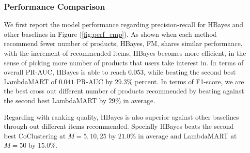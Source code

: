 \begin{table}[htb]
\begin{center}
\end{center}
\caption{NDCG on e-commerce recommendations}
\label{NDCG_cmp}
\end{table}

\subsubsection{Performance Comparison}
We first report the model performance regarding precision-recall for HBayes and other baselines in Figure (\ref{fig:perf_cmp}).  As shown when each method recommend fewer number of products, HBayes, FM, shares similar performance, with the increment of recommended items, HBayes becomes more efficient, in the sense of picking more number of products that users take interest in.  In terms of overall PR-AUC, HBayes is able to reach $0.053$, while beating the second best LambdaMART of $0.041$ PR-AUC by $29.3\%$ percent.   In terms of F1-score, we are the best cross out different number of products recommended by beating against the second best LambdaMART by $29\%$ in average.  

Regarding with ranking quality, HBayes is also superior against other baselines through out different items recommended.  Specially HBayes beats the second best CoClustering at $M=5,10,25$ by $21.0\%$ in average and LambdaMART at $M=50$ by $15.0\%$.  


